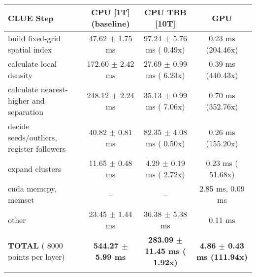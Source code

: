     \begin{tabular}{l|c|c|c}
    \hline
    CLUE Step                                 & CPU [1T] (baseline)         & CPU TBB [10T]                         & GPU                       \\ \hline
    build fixed-grid spatial index            &  47.62 $\pm$  1.75 ms       &  97.24 $\pm$  5.76 ms ( 0.49x)        &   0.23 ms (204.46x)       \\
    calculate local density                   & 172.60 $\pm$  2.42 ms       &  27.69 $\pm$  0.99 ms ( 6.23x)        &   0.39 ms (440.43x)       \\
    calculate nearest-higher and separation   & 248.12 $\pm$  2.24 ms       &  35.13 $\pm$  0.99 ms ( 7.06x)        &   0.70 ms (352.76x)       \\
    decide seeds/outliers, register followers &  40.82 $\pm$  0.81 ms       &  82.35 $\pm$  4.08 ms ( 0.50x)        &   0.26 ms (155.20x)       \\
    expand clusters                           &  11.65 $\pm$  0.48 ms       &   4.29 $\pm$  0.19 ms ( 2.72x)        &   0.23 ms ( 51.68x)       \\ \hline
    cuda memcpy, memset                       & --                          & --                                    &   2.85 ms,   0.09 ms      \\ 
    other                                     &  23.45 $\pm$  1.44 ms       &  36.38 $\pm$  5.38 ms                 &   0.11 ms                 \\ \hline
    \textbf{TOTAL} ( 8000 points per layer)   & \textbf{544.27 $\pm$  5.99 ms} & \textbf{283.09 $\pm$ 11.45 ms ( 1.92x)} & \textbf{  4.86 $\pm$  0.43 ms (111.94x)}  \\
    \hline
    \multicolumn{4}{c}{} 
    \end{tabular}
    \linebreak


